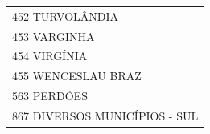 \documentclass{article}
\begin{document}
\begin{longtable}[c]{m{18cm}}
\multicolumn{1}{l}{ \hspace{2em} 452 TURVOLÂNDIA } \\
\multicolumn{1}{l}{ \hspace{2em} 453 VARGINHA } \\
\multicolumn{1}{l}{ \hspace{2em} 454 VIRGÍNIA } \\
\multicolumn{1}{l}{ \hspace{2em} 455 WENCESLAU BRAZ } \\
\multicolumn{1}{l}{ \hspace{2em} 563 PERDÕES } \\
\multicolumn{1}{l}{ \hspace{2em} 867 DIVERSOS MUNICÍPIOS - SUL } \\
\end{longtable}
\newpage
\end{document}
